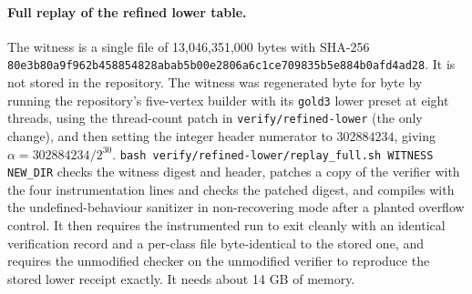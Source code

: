\documentclass[11pt]{article}
\theoremstyle{remark}
\numberwithin{equation}{section}
\begin{document}
\paragraph{Full replay of the refined lower table.} The witness is a single file of 13{,}046{,}351{,}000 bytes with SHA-256 \texttt{80e3b80a9f962b458854828abab5b00e2806a6c1ce709835b5e884b0afd4ad28}. It is not stored in the repository. The witness was regenerated byte for byte by running the repository's five-vertex builder with its \texttt{gold3} lower preset at eight threads, using the thread-count patch in \texttt{verify/refined-lower} (the only change), and then setting the integer header numerator to $302884234$, giving $\alpha=302884234/2^{30}$. \texttt{bash verify/refined-lower/replay\_full.sh WITNESS NEW\_DIR} checks the witness digest and header, patches a copy of the verifier with the four instrumentation lines and checks the patched digest, and compiles with the undefined-behaviour sanitizer in non-recovering mode after a planted overflow control. It then requires the instrumented run to exit cleanly with an identical verification record and a per-class file byte-identical to the stored one, and requires the unmodified checker on the unmodified verifier to reproduce the stored lower receipt exactly. It needs about 14 GB of memory.
\end{document}
